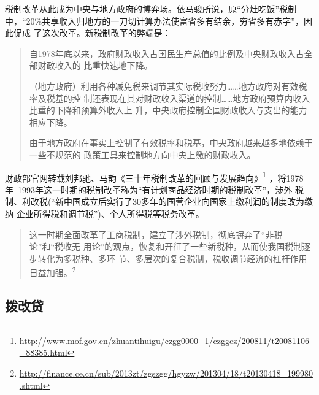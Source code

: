 税制改革从此成为中央与地方政府的博弈场。依马骏所说，原“分灶吃饭”税制
中，“20\%共享收入归地方的一刀切计算办法使富省多有结余，穷省多有赤字”，因此促成
了这次改革。新税制改革的弊端是：
\begin{quotation}
  自1978年底以来，政府财政收入占国民生产总值的比例及中央财政收入占全部财政收入的
  比重快速地下降。

  （地方政府）利用各种减免税来调节其实际税收努力……地方政府对有效税率及税基的控
  制还表现在其对财政收入渠道的控制……地方政府预算内收入比重的下降和预算外收入上
  升，中央政府控制全国财政收入与支出的能力相应下降。

  由于地方政府在事实上控制了有效税率和税基，中央政府越来越多地依赖于一些不规范的
  政策工具来控制地方向中央上缴的财政收入。\cite{majuncaigai}
\end{quotation}

财政部官网转载刘邦驰、马韵《三十年税制改革的回顾与发展趋向》\footnote{\url{http://www.mof.gov.cn/zhuantihuigu/czgg0000_1/czggcz/200811/t20081106_88385.html}}
，将1978年--1993年这一时期的税制改革称为“有计划商品经济时期的税制改革”，涉外
税制、利改税(“新中国成立后实行了30多年的国营企业向国家上缴利润的制度改为缴纳
企业所得税和调节税”)、个人所得税等税务改革。
\begin{quotation}
  这一时期全面改革了工商税制，建立了涉外税制，彻底摒弃了“非税论”和“税收无
  用论”的观点，恢复和开征了一些新税种，从而使我国税制逐步转化为多税种、多环
  节、多层次的复合税制，税收调节经济的杠杆作用日益加强。\footnote{\url{http://finance.ce.cn/sub/2013zt/zgszgg/hgyzw/201304/18/t20130418_199980.shtml}}
\end{quotation}


\subsection{拨改贷}

